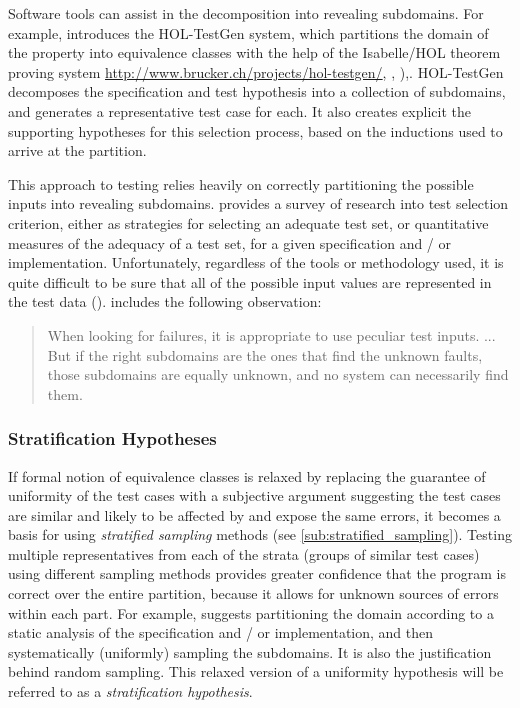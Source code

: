 Software tools can assist in the decomposition into revealing subdomains.
For example, \cite{Brucker2012} introduces the HOL-TestGen system,
which partitions the domain of the property into equivalence classes
with the help of the Isabelle/HOL theorem proving system
\url{http://www.brucker.ch/projects/hol-testgen/}, \cite{HOL-testgen-UG}, \cite{Brucker2009}),.
HOL-TestGen decomposes the specification and test hypothesis 
into a collection of subdomains,
and generates a representative test case for each.
It also creates explicit the supporting hypotheses for this selection process,
based on the inductions used to arrive at the partition.

This approach to testing relies heavily on
correctly partitioning the possible inputs into revealing subdomains.
\cite{ZhuHallMay1997} provides a survey of research into test selection criterion, 
either as strategies for selecting an adequate test set,
or quantitative measures of the adequacy of a test set,
for a given specification and / or implementation.
Unfortunately, regardless of the tools or methodology used,
it is quite difficult to be sure that
all of the possible input values are represented in the test data 
(\cite{Cartwright1981}).
\cite{HamletTaylor1990} includes the following observation:
\begin{quote}
When looking for failures, it is appropriate to use peculiar test inputs. ...
But if the right subdomains are the ones that find the unknown faults,
those subdomains are equally unknown, and no system can necessarily find them.
\end{quote}

\subsubsection{Stratification Hypotheses}\label{sub:stratificationhyp}

If formal notion of equivalence classes is relaxed
by replacing the guarantee of uniformity of the test cases
with a subjective argument suggesting the test cases are similar
and likely to be affected by and expose the same errors,
it becomes a basis for using \emph{stratified sampling} methods 
(see \ref{sub:stratified_sampling}).
Testing multiple representatives from each of the strata (groups of similar test cases)
using different sampling methods provides greater confidence
that the program is correct over the entire partition,
because it allows for unknown sources of errors within each part.
For example, \cite{HamletTaylor1990} suggests 
partitioning the domain according to a static analysis of
the specification and / or implementation, 
and then systematically (uniformly) sampling the subdomains.
It is also the justification behind random sampling.
This relaxed version of a uniformity hypothesis
will be referred to as a \emph{stratification hypothesis}.

